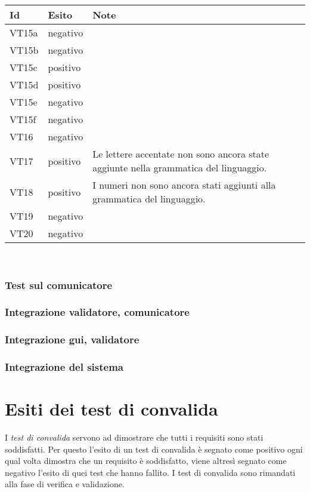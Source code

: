 \begin{center}
\begin{tabular}{|p{1cm}|p{1.6cm}|p{8.4cm}|} \hline
\textbf{Id} & \textbf{Esito} & \textbf{Note} \\ \hline
VT15a & negativo & \\ \hline
VT15b & negativo & \\ \hline
VT15c & positivo & \\ \hline
VT15d & positivo & \\ \hline
VT15e & negativo & \\ \hline
VT15f & negativo & \\ \hline
VT16 & negativo & \\ \hline
VT17 & positivo & Le lettere accentate non sono ancora state aggiunte nella grammatica del linguaggio.\\ \hline
VT18 & positivo & I numeri non sono ancora stati aggiunti alla grammatica del linguaggio.\\ \hline
VT19 & negativo & \\ \hline
VT20 & negativo & \\ \hline
\end{tabular} \\
\end{center}

\subsection{Test sul comunicatore}
\subsection{Integrazione validatore, comunicatore}
\subsection{Integrazione gui, validatore}
\subsection{Integrazione del sistema}

\chapter{Esiti dei test di convalida}
I \textit{test di convalida} servono ad dimostrare che tutti i requisiti sono stati soddisfatti. Per questo l'esito di un test di convalida \`e segnato come positivo ogni qual volta dimostra che un requisito \`e soddisfatto, viene altres\`i segnato come negativo l'esito di quei test che hanno fallito.
I test di convalida sono rimandati alla fase di verifica e validazione.

